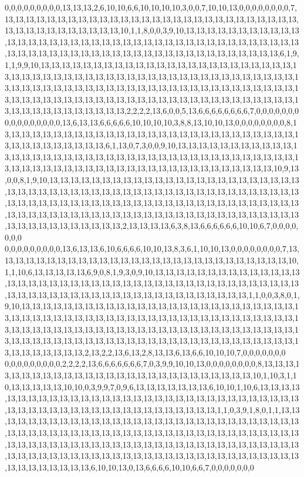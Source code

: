 0,0,0,0,0,0,0,0,0,13,13,13,2,6,10,10,6,6,10,10,10,10,3,0,0,7,10,10,13,0,0,0,0,0,0,0,0,7,13,13,13,13,13,13,13,13,13,13,13,13,13,13,13,13,13,13,13,13,13,13,13,13,13,13,13,13,13,13,13,13,13,13,13,13,13,13,13,10,1,1,8,0,0,3,9,10,13,13,13,13,13,13,13,13,13,13,13,13,13,13,13,13,13,13,13,13,13,13,13,13,13,13,13,13,13,13,13,13,13,13,13,13,13,13,13,13,13,13,13,13,13,13,13,13,13,13,13,13,13,13,13,13,13,13,13,13,13,13,13,13,13,6,1,9,1,1,9,9,10,13,13,13,13,13,13,13,13,13,13,13,13,13,13,13,13,13,13,13,13,13,13,13,13,13,13,13,13,13,13,13,13,13,13,13,13,13,13,13,13,13,13,13,13,13,13,13,13,13,13,13,13,13,13,13,13,13,13,13,13,13,13,13,13,13,13,13,13,13,13,13,13,13,13,13,13,13,13,13,13,13,13,13,13,13,13,13,13,13,13,13,13,13,13,13,13,13,13,13,13,13,13,13,13,13,13,13,13,13,13,13,13,13,13,13,13,13,13,13,13,2,2,2,2,13,6,0,0,5,13,6,6,6,6,6,6,6,6,7,0,0,0,0,0,0,0
0,0,0,0,0,0,0,0,0,13,6,13,13,6,6,6,6,6,10,10,10,10,3,8,8,13,10,10,13,0,0,0,0,0,0,0,0,8,13,13,13,13,13,13,13,13,13,13,13,13,13,13,13,13,13,13,13,13,13,13,13,13,13,13,13,13,13,13,13,13,13,13,13,13,13,13,6,1,13,0,7,3,0,0,9,10,13,13,13,13,13,13,13,13,13,13,13,13,13,13,13,13,13,13,13,13,13,13,13,13,13,13,13,13,13,13,13,13,13,13,13,13,13,13,13,13,13,13,13,13,13,13,13,13,13,13,13,13,13,13,13,13,13,13,13,13,13,13,13,13,13,10,9,13,0,0,8,1,9,10,13,13,13,13,13,13,13,13,13,13,13,13,13,13,13,13,13,13,13,13,13,13,13,13,13,13,13,13,13,13,13,13,13,13,13,13,13,13,13,13,13,13,13,13,13,13,13,13,13,13,13,13,13,13,13,13,13,13,13,13,13,13,13,13,13,13,13,13,13,13,13,13,13,13,13,13,13,13,13,13,13,13,13,13,13,13,13,13,13,13,13,13,13,13,13,13,13,13,13,13,13,13,13,13,13,13,13,13,13,13,13,13,13,13,13,13,13,13,13,2,13,13,13,13,6,3,8,13,6,6,6,6,6,6,10,10,6,7,0,0,0,0,0,0,0
0,0,0,0,0,0,0,0,0,13,6,13,13,6,10,6,6,6,6,10,10,13,8,3,6,1,10,10,13,0,0,0,0,0,0,0,0,7,13,13,13,13,13,13,13,13,13,13,13,13,13,13,13,13,13,13,13,13,13,13,13,13,13,13,13,13,10,1,1,10,6,13,13,13,13,13,6,9,0,8,1,9,3,0,9,10,13,13,13,13,13,13,13,13,13,13,13,13,13,13,13,13,13,13,13,13,13,13,13,13,13,13,13,13,13,13,13,13,13,13,13,13,13,13,13,13,13,13,13,13,13,13,13,13,13,13,13,13,13,13,13,13,13,13,13,13,13,13,13,13,13,1,1,0,0,3,8,0,1,9,10,13,13,13,13,13,13,13,13,13,13,13,13,13,13,13,13,13,13,13,13,13,13,13,13,13,13,13,13,13,13,13,13,13,13,13,13,13,13,13,13,13,13,13,13,13,13,13,13,13,13,13,13,13,13,13,13,13,13,13,13,13,13,13,13,13,13,13,13,13,13,13,13,13,13,13,13,13,13,13,13,13,13,13,13,13,13,13,13,13,13,13,13,13,13,13,13,13,13,13,13,13,13,13,13,13,13,13,13,13,13,13,13,13,13,13,13,13,13,2,13,2,2,13,6,13,2,8,13,13,6,13,6,6,10,10,10,7,0,0,0,0,0,0,0
0,0,0,0,0,0,0,0,0,2,2,2,2,13,6,6,6,6,6,6,6,7,0,3,9,9,10,10,13,0,0,0,0,0,0,0,0,8,13,13,13,13,13,13,13,13,13,13,13,13,13,13,13,13,13,13,13,13,13,13,13,13,13,13,13,10,1,10,3,1,10,13,13,13,13,13,10,10,0,3,9,9,7,0,9,6,13,13,13,13,13,13,13,6,10,10,1,10,6,13,13,13,13,13,13,13,13,13,13,13,13,13,13,13,13,13,13,13,13,13,13,13,13,13,13,13,13,13,13,13,13,13,13,13,13,13,13,13,13,13,13,13,13,13,13,13,13,13,13,13,13,1,1,0,3,9,1,8,0,1,1,13,13,13,13,13,13,13,13,13,13,13,13,13,13,13,13,13,13,13,13,13,13,13,13,13,13,13,13,13,13,13,13,13,13,13,13,13,13,13,13,13,13,13,13,13,13,13,13,13,13,13,13,13,13,13,13,13,13,13,13,13,13,13,13,13,13,13,13,13,13,13,13,13,13,13,13,13,13,13,13,13,13,13,13,13,13,13,13,13,13,13,13,13,13,13,13,13,13,13,13,13,13,13,13,13,13,13,13,13,13,13,13,13,13,13,13,13,13,13,13,13,13,6,10,10,13,0,13,6,6,6,6,10,10,6,6,7,0,0,0,0,0,0,0
